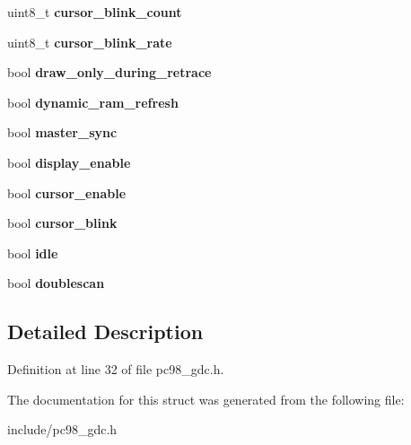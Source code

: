 \begin{DoxyCompactItemize}
\item 
\hypertarget{structPC98__GDC__state_aebd7aff24bf501c09a83521de8bc756b}{uint8\-\_\-t {\bfseries cursor\-\_\-blink\-\_\-count}}\label{structPC98__GDC__state_aebd7aff24bf501c09a83521de8bc756b}

\item 
\hypertarget{structPC98__GDC__state_a1da10b2642246d1e4315b301f91b816f}{uint8\-\_\-t {\bfseries cursor\-\_\-blink\-\_\-rate}}\label{structPC98__GDC__state_a1da10b2642246d1e4315b301f91b816f}

\item 
\hypertarget{structPC98__GDC__state_a30fc555b9d29ee7b94597c134903fa1a}{bool {\bfseries draw\-\_\-only\-\_\-during\-\_\-retrace}}\label{structPC98__GDC__state_a30fc555b9d29ee7b94597c134903fa1a}

\item 
\hypertarget{structPC98__GDC__state_ab2e743dbada1318967bd10505bcfae33}{bool {\bfseries dynamic\-\_\-ram\-\_\-refresh}}\label{structPC98__GDC__state_ab2e743dbada1318967bd10505bcfae33}

\item 
\hypertarget{structPC98__GDC__state_a2f82a64dee33666f051f2358b39b36e1}{bool {\bfseries master\-\_\-sync}}\label{structPC98__GDC__state_a2f82a64dee33666f051f2358b39b36e1}

\item 
\hypertarget{structPC98__GDC__state_a6d8c34e7786906c0bf3a71a8223b47c7}{bool {\bfseries display\-\_\-enable}}\label{structPC98__GDC__state_a6d8c34e7786906c0bf3a71a8223b47c7}

\item 
\hypertarget{structPC98__GDC__state_a2d974909bf478b470db46d7a391d45be}{bool {\bfseries cursor\-\_\-enable}}\label{structPC98__GDC__state_a2d974909bf478b470db46d7a391d45be}

\item 
\hypertarget{structPC98__GDC__state_a052103fb7ab862c6087ca893f42b1889}{bool {\bfseries cursor\-\_\-blink}}\label{structPC98__GDC__state_a052103fb7ab862c6087ca893f42b1889}

\item 
\hypertarget{structPC98__GDC__state_ace0fcb3c221beebe98c51e49be38bb2f}{bool {\bfseries idle}}\label{structPC98__GDC__state_ace0fcb3c221beebe98c51e49be38bb2f}

\item 
\hypertarget{structPC98__GDC__state_a38abe8d027dbbe87e2abeda97a7b1ebb}{bool {\bfseries doublescan}}\label{structPC98__GDC__state_a38abe8d027dbbe87e2abeda97a7b1ebb}

\end{DoxyCompactItemize}


\subsection{Detailed Description}


Definition at line 32 of file pc98\-\_\-gdc.\-h.



The documentation for this struct was generated from the following file\-:\begin{DoxyCompactItemize}
\item 
include/pc98\-\_\-gdc.\-h\end{DoxyCompactItemize}
